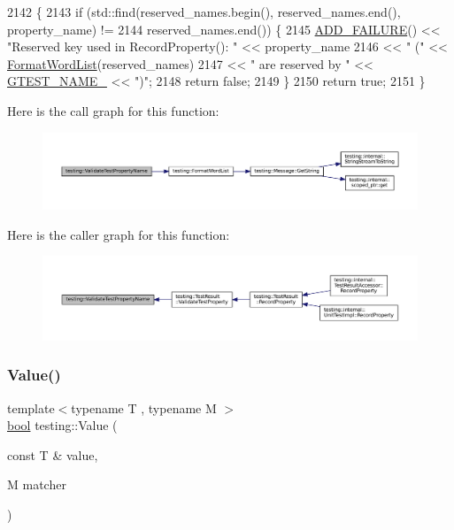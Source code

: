 \begin{DoxyCode}
2142                                                                           \{
2143   \textcolor{keywordflow}{if} (std::find(reserved\_names.begin(), reserved\_names.end(), property\_name) !=
2144           reserved\_names.end()) \{
2145     \hyperlink{gtest_8h_adc16b5b0a740c39084ea5c9e960e3063}{ADD\_FAILURE}() << \textcolor{stringliteral}{"Reserved key used in RecordProperty(): "} << property\_name
2146                   << \textcolor{stringliteral}{" ("} << \hyperlink{namespacetesting_a4354761948a5cf56fdf905418a0f78f1}{FormatWordList}(reserved\_names)
2147                   << \textcolor{stringliteral}{" are reserved by "} << \hyperlink{gtest-port_8h_a13d98c217176bd8722c395b9225fc19d}{GTEST\_NAME\_} << \textcolor{stringliteral}{")"};
2148     \textcolor{keywordflow}{return} \textcolor{keyword}{false};
2149   \}
2150   \textcolor{keywordflow}{return} \textcolor{keyword}{true};
2151 \}
\end{DoxyCode}
Here is the call graph for this function\+:
\nopagebreak
\begin{figure}[H]
\begin{center}
\leavevmode
\includegraphics[width=350pt]{namespacetesting_a4c9bd414747bf0563bfdb32a2307dcdf_cgraph}
\end{center}
\end{figure}
Here is the caller graph for this function\+:
\nopagebreak
\begin{figure}[H]
\begin{center}
\leavevmode
\includegraphics[width=350pt]{namespacetesting_a4c9bd414747bf0563bfdb32a2307dcdf_icgraph}
\end{center}
\end{figure}
\mbox{\label{namespacetesting_ae44c50a3a7f0a46f05c8a0b0592b4a62}} 
\subsubsection{\texorpdfstring{Value()}{Value()}}
{\footnotesize\ttfamily template$<$typename T , typename M $>$ \\
\hyperlink{classbool}{bool} testing\+::\+Value (\begin{DoxyParamCaption}\item[{const T \&}]{value,  }\item[{M}]{matcher }\end{DoxyParamCaption})\hspace{0.3cm}{\ttfamily [inline]}}



